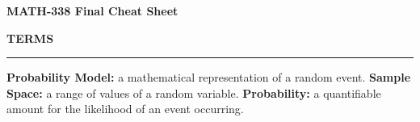 \documentclass[6pt]{article}
\begin{document}
\begin{footnotesize}

\begin{center}
\textbf{MATH-338 Final Cheat Sheet}
\end{center}

\textbf{TERMS}

\par\noindent\rule{\textwidth}{0.4pt}

\textbf{Probability Model:} a mathematical representation of a random event. \textbf{Sample Space:} a range of values of a random variable. \textbf{Probability:} a quantifiable amount for the likelihood of an event occurring. 










\end{footnotesize}
\end{document}
